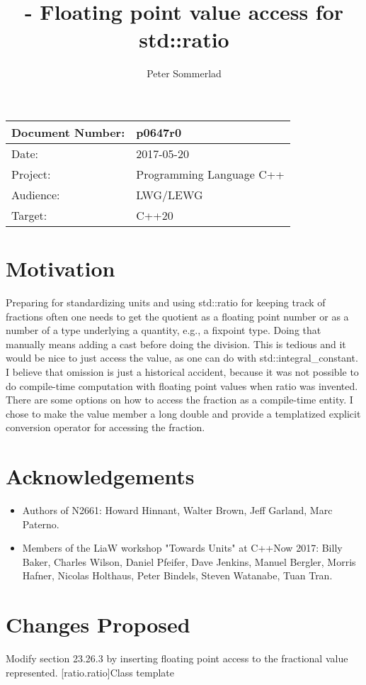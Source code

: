 \documentclass[ebook,11pt,article]{memoir}
\title{\papernumber{} - Floating point value access for std::ratio}
\author{Peter Sommerlad}
\date{\paperdate}                        %
\newcommand{\papernumber}{p0647r0}
\newcommand{\paperdate}{2017-05-20}
\begin{document}
\maketitle
\begin{tabular}[t]{|l|l|}\hline 
Document Number:& \papernumber  \\\hline
Date: & \paperdate \\\hline
Project: & Programming Language C++\\\hline 
Audience: & LWG/LEWG\\\hline
Target: & C++20\\\hline
\end{tabular}

\chapter{Motivation}

Preparing for standardizing units and using std::ratio for keeping track of fractions often one needs to get the quotient as a floating point number or as a number of a type underlying a quantity, e.g., a fixpoint type. Doing that manually means adding a cast before doing the division. This is tedious and it would be nice to just access the value, as one can do with std::integral_constant. I believe that omission is just a historical accident, because it was not possible to do compile-time computation with floating point values when ratio was invented. There are some options on how to access the fraction as a compile-time entity. I chose to make the value member a long double and provide a templatized explicit conversion operator for accessing the fraction.

\chapter{Acknowledgements}
\begin{itemize}
\item Authors of N2661: Howard Hinnant, Walter Brown, Jeff Garland, Marc Paterno.
\item Members of the LiaW workshop "Towards Units" at C++Now 2017: Billy Baker, Charles Wilson, Daniel Pfeifer, Dave Jenkins, Manuel Bergler, Morris Hafner, Nicolas Holthaus, Peter Bindels, Steven Watanabe, Tuan Tran.

\end{itemize}

\newpage
\chapter{Changes Proposed}
Modify section 23.26.3 by inserting floating point access to the fractional value represented.
[ratio.ratio]{Class template }
\end{document}
